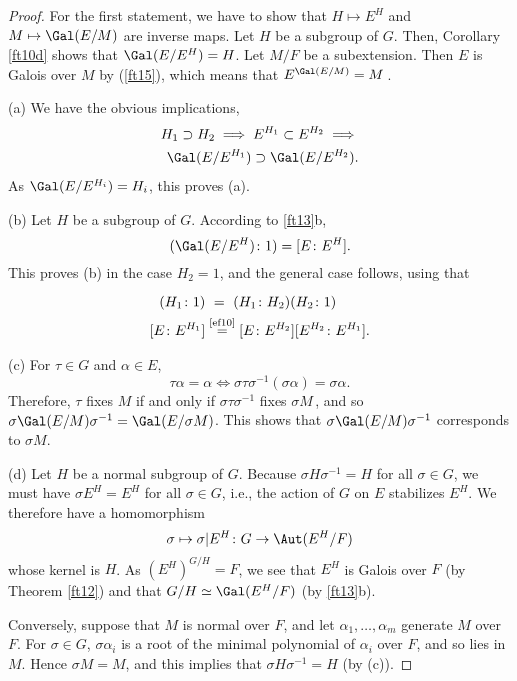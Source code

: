 \documentclass[a4paper,11pt,final,openany]{memoir}
\theoremstyle{nonumberplain}
\newtheorem{proof}{Proof.}
\begin{document}
\begin{proof}
For the first statement, we have to show that $H\mapsto E^{H}$ and
$M\mapsto\Gal(E/M)$ are inverse maps. Let $H$ be a subgroup of $G$. Then,
Corollary \ref{ft10d} shows that $\Gal(E/E^{H})=H$. Let $M/F$ be a
subextension. Then $E$ is Galois over $M$ by (\ref{ft15}), which means that
$E^{\Gal(E/M)}=M\,$.

(a) We have the obvious implications,
\begin{align*}
H_{1}\supset H_{2}\implies E^{H_{1}}\subset E^{H_{2}}\implies\\
\Gal(E/E^{H_{1}%
})\supset\Gal(E/E^{H_{2}}).
\end{align*}
As $\Gal(E/E^{H_{i}})=H_{i}$, this proves (a).

(b) Let $H$ be a subgroup of $G$. According to \ref{ft13}b, \qquad\
\[
(\Gal(E/E^{H})\colon1)=[E\colon E^{H}].
\]
This proves (b) in the case $H_{2}=1$, and the general case follows, using
that
\begin{align*}
(H_{1}\colon1)  &  \overset{\phantom{1.20}}{=}(H_{1}\colon H_{2})(H_{2}%
\colon1)\quad\\
\lbrack E\colon E^{H_{1}}]  &  \overset{\text{\ref{ef10}}}{=}[E\colon
E^{H_{2}}][E^{H_{2}}\colon E^{H_{1}}].
\end{align*}


(c) For $\tau\in G$ and $\alpha\in E$,
\[
\tau\alpha=\alpha\iff\sigma\tau\sigma^{-1}(\sigma\alpha)=\sigma\alpha.
\]
Therefore, $\tau$ fixes $M$ if and only if $\sigma\tau\sigma^{-1}$ fixes
$\sigma M\,$, and so $\sigma\Gal(E/M)\sigma^{-1}=\Gal(E/\sigma M)$. This shows
that $\sigma\Gal(E/M)\sigma^{-1}$ corresponds to $\sigma M.$

(d) Let $H$ be a normal subgroup of $G$. Because $\sigma H\sigma^{-1}=H$ for
all $\sigma\in G$, we must have $\sigma E^{H}=E^{H}$ for all $\sigma\in G$,
i.e., the action of $G$ on $E$ stabilizes $E^{H}$. We therefore have a
homomorphism
\[
\sigma\mapsto\sigma|E^{H}\colon G\rightarrow\Aut(E^{H}/F)
\]
whose kernel is $H$. As $(E^{H})^{G/H}=F$, we see that $E^{H}$ is Galois over
$F$ (by Theorem \ref{ft12}) and that $G/H\simeq\Gal(E^{H}/F)$ (by \ref{ft13}b).

Conversely, suppose that $M$ is normal over $F$, and let $\alpha_{1}%
,\ldots,\alpha_{m}$ generate $M$ over $F$. For $\sigma\in G$, $\sigma
\alpha_{i}$ is a root of the minimal polynomial of $\alpha_{i}$ over $F$, and
so lies in $M$. Hence $\sigma M=M$, and this implies that $\sigma H\sigma
^{-1}=H$ (by (c)).
\end{proof}
\end{document}
